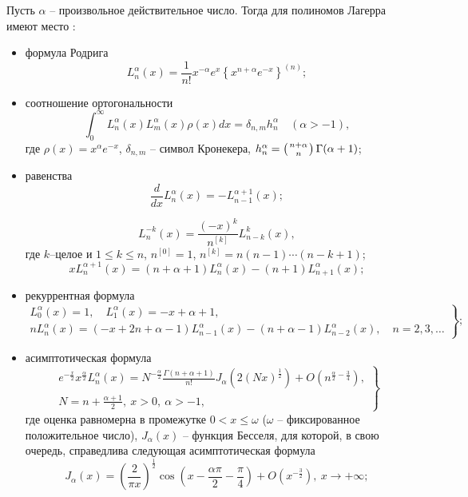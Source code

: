 \documentclass[a4paper,12pt]{article}
\begin{document}
Пусть $\alpha$ -- произвольное действительное число. Тогда для полиномов Лагерра имеют место \cite{Ramlib2}:
\begin{itemize}
\item
формула Родрига
\begin{equation*}
L_n^{\alpha}(x) = \frac{1}{n!}x^{-\alpha}e^{x} \left\{ x^{n+\alpha} e^{-x} \right\}^{(n)};
\end{equation*}

\item
соотношение ортогональности
\begin{equation}\label{Ram_eq3}
\int_0^{\infty} L^{\alpha}_{n}(x) L^{\alpha}_{m}(x)\rho(x) dx = \delta_{n,m} h^{\alpha}_n \quad (\alpha > -1),
\end{equation}
где $\rho(x)=x^{\alpha} e^{-x}$, $\delta_{n,m}$ -- символ Кронекера, $h^{\alpha}_n = \left( n+\alpha \atop n \right) \Gamma(\alpha +1)$;

\item
равенства
\begin{equation*}
\frac{d}{dx} L_n^{\alpha}(x) = -L_{n-1}^{\alpha+1}(x);
\end{equation*}

\begin{equation*}
L_{n}^{-k}(x) =\frac{(-x)^k}{n^{[k]}}L_{n-k}^{k}(x),
\end{equation*}
где $k$--целое и $1\leq k\leq n$, $n^{[0]}=1$, $n^{[k]}=n(n-1)\cdots(n-k+1)$;
\begin{equation*}
xL_{n}^{\alpha+1}(x) =(n+\alpha+1)L_{n}^{\alpha}(x) -(n+1)L_{n+1}^{\alpha}(x);
\end{equation*}

\item
рекуррентная формула
\begin{equation}\label{Ram_eq4}
\left.\begin{gathered}
L_{0}^{\alpha}(x)=1, \quad L_1^{\alpha}(x)=-x+\alpha+1,\\
nL_n^{\alpha}(x)=(-x+2n+\alpha-1)L_{n-1}^{\alpha}(x)-(n+\alpha-1)L_{n-2}^{\alpha}(x), \quad n=2, 3, \ldots
\end{gathered}\right\};
\end{equation}

\item
асимптотическая формула
\begin{equation*}
\left.\begin{gathered}
e^{-\frac{x}{2}}x^{\frac{\alpha}{2}}L_n^\alpha(x)=N^{-\frac{\alpha}{2}}\frac{\Gamma(n+\alpha+1)}{n!}J_\alpha\left(2(Nx)^\frac{1}{2}\right)
+O\left(n^{\frac{\alpha}{2}-\frac{3}{4}}\right),\\
N=n+\frac{\alpha+1}{2},\ x>0, \ \alpha>-1,
\end{gathered}\right\}
\end{equation*}
где оценка равномерна в промежутке $0<x\leq\omega$ ($\omega$ -- фиксированное положительное число), $J_\alpha(x)$ -- функция Бесселя, для которой, в свою очередь, справедлива следующая асимптотическая формула
\begin{equation*}
J_\alpha(x)=\left(\frac{2}{\pi x}\right)^{\frac{1}{2}}\cos\left(x-\frac{\alpha\pi}{2}-\frac{\pi}{4}\right)+O\left(x^{-\frac{3}{2}}\right),\ x\rightarrow+\infty;
\end{equation*}


\end{itemize}
\end{document}
